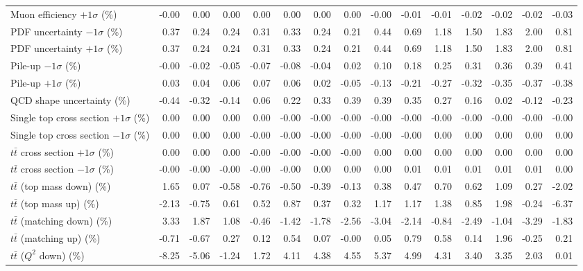 \begin{table}[htbp]
{\begin{tabular}{lrrrrrrrrrrrrrr}
Muon efficiency $+1\sigma$ (\%) & -0.00 & 0.00 & 0.00 & 0.00 & 0.00 & 0.00 & 0.00 & -0.00 & -0.01 & -0.01 & -0.02 & -0.02 & -0.02 & -0.03 \\ 
PDF uncertainty $-1\sigma$ (\%) & 0.37 & 0.24 & 0.24 & 0.31 & 0.33 & 0.24 & 0.21 & 0.44 & 0.69 & 1.18 & 1.50 & 1.83 & 2.00 & 0.81 \\ 
PDF uncertainty $+1\sigma$ (\%) & 0.37 & 0.24 & 0.24 & 0.31 & 0.33 & 0.24 & 0.21 & 0.44 & 0.69 & 1.18 & 1.50 & 1.83 & 2.00 & 0.81 \\ 
Pile-up $-1\sigma$ (\%) & -0.00 & -0.02 & -0.05 & -0.07 & -0.08 & -0.04 & 0.02 & 0.10 & 0.18 & 0.25 & 0.31 & 0.36 & 0.39 & 0.41 \\ 
Pile-up $+1\sigma$ (\%) & 0.03 & 0.04 & 0.06 & 0.07 & 0.06 & 0.02 & -0.05 & -0.13 & -0.21 & -0.27 & -0.32 & -0.35 & -0.37 & -0.38 \\ 
QCD shape uncertainty (\%) & -0.44 & -0.32 & -0.14 & 0.06 & 0.22 & 0.33 & 0.39 & 0.39 & 0.35 & 0.27 & 0.16 & 0.02 & -0.12 & -0.23 \\ 
Single top cross section $+1\sigma$ (\%) & 0.00 & 0.00 & 0.00 & 0.00 & -0.00 & -0.00 & -0.00 & -0.00 & -0.00 & -0.00 & -0.00 & -0.00 & -0.00 & -0.00 \\ 
Single top cross section $-1\sigma$ (\%) & 0.00 & 0.00 & 0.00 & -0.00 & -0.00 & -0.00 & -0.00 & -0.00 & -0.00 & 0.00 & 0.00 & 0.00 & 0.00 & 0.00 \\ 
$t\bar{t}$ cross section $+1\sigma$ (\%) & 0.00 & 0.00 & 0.00 & -0.00 & -0.00 & -0.00 & -0.00 & 0.00 & 0.00 & 0.00 & 0.00 & 0.00 & 0.00 & 0.00 \\ 
$t\bar{t}$ cross section $-1\sigma$ (\%) & -0.00 & -0.00 & -0.00 & -0.00 & -0.00 & 0.00 & 0.00 & 0.00 & 0.01 & 0.01 & 0.01 & 0.01 & 0.01 & 0.00 \\ 
$t\bar{t}$ (top mass down) (\%) & 1.65 & 0.07 & -0.58 & -0.76 & -0.50 & -0.39 & -0.13 & 0.38 & 0.47 & 0.70 & 0.62 & 1.09 & 0.27 & -2.02 \\ 
$t\bar{t}$ (top mass up) (\%) & -2.13 & -0.75 & 0.61 & 0.52 & 0.87 & 0.37 & 0.32 & 1.17 & 1.17 & 1.38 & 0.85 & 1.98 & -0.24 & -6.37 \\ 
$t\bar{t}$ (matching down) (\%) & 3.33 & 1.87 & 1.08 & -0.46 & -1.42 & -1.78 & -2.56 & -3.04 & -2.14 & -0.84 & -2.49 & -1.04 & -3.29 & -1.83 \\ 
$t\bar{t}$ (matching up) (\%) & -0.71 & -0.67 & 0.27 & 0.12 & 0.54 & 0.07 & -0.00 & 0.05 & 0.79 & 0.58 & 0.14 & 1.96 & -0.25 & 0.21 \\ 
$t\bar{t}$ ($Q^{2}$ down) (\%) & -8.25 & -5.06 & -1.24 & 1.72 & 4.11 & 4.38 & 4.55 & 5.37 & 4.99 & 4.31 & 3.40 & 3.35 & 2.03 & 0.01 \\ 

\end{tabular}}
\end{table}
